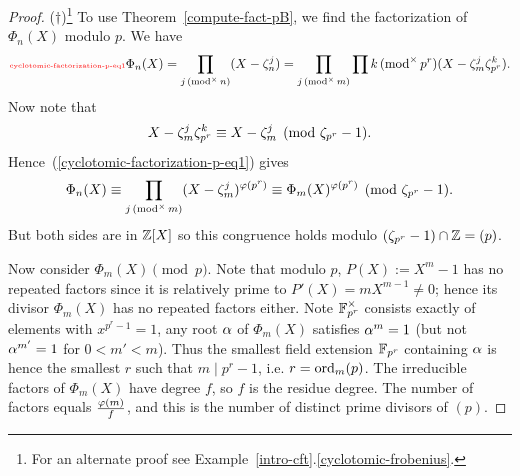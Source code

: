 \begin{proof}($\dagger$)\footnote{For an alternate proof see Example~\ref{intro-cft}.\ref{cyclotomic-frobenius}.} 
To use Theorem~\ref{compute-fact-pB}, we find the factorization of $\Phi_n(X)$ modulo $p$. We have
\begin{equation}\llabel{cyclotomic-factorization-p-eq1}
\Phi_n(X)=\prod_{j\modt{n}}(X-\ze_n^j)
=\prod_{j\modt{m}}\prod{k\modt{p^r}} (X-\ze_m^j\ze_{p^r}^k).
\end{equation}
Now note that
\[
X-\zeta_m^j\zeta_{p^r}^k\equiv X-\zeta_m^j\pmod{\zeta_{p^r}-1}.
\]
Hence~(\ref{cyclotomic-factorization-p-eq1}) gives
\[
\Phi_n(X)\equiv \prod_{j\,(\text{mod}^{\times}\, {m})} (X-\zeta_m^j)^{\varphi(p^r)}
\equiv \Phi_m(X)^{\varphi(p^r)}\pmod{\zeta_{p^r}-1}.
\]
But both sides are in $\mathbb{Z}[X]$ so this congruence holds modulo $(\zeta_{p^r}-1)\cap \mathbb{Z}=(p)$.

Now consider $\Phi_m(X)\pmod{p}$. Note that modulo $p$, $P(X):=X^m-1$ has no repeated factors since it is relatively prime to  $P'(X)=mX^{m-1}\ne 0$; hence its divisor $\Phi_m(X)$ has no repeated factors either. Note $\mathbb{F}_{p^r}^{\times}$ consists exactly of elements with $x^{p^r-1}=1$, any root $\alpha$ of $\Phi_m(X)$ satisfies $\alpha^m=1$ (but not $\alpha^{m'}=1$ for $0<m'<m$). Thus the smallest field extension $\mathbb{F}_{p^r}$ containing $\alpha$ is hence the smallest $r$ such that $m\mid p^r-1$, i.e. $r=\operatorname{ord}_m(p)$. The irreducible factors of $\Phi_m(X)$ have degree $f$, so $f$ is the residue degree. The number of factors equals $\frac{\varphi(m)}{f}$, and this is the number of distinct prime divisors of $(p)$.
\end{proof}
